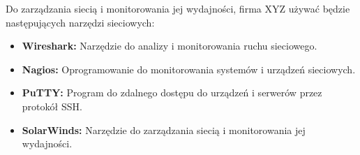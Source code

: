     Do zarządzania siecią i monitorowania jej wydajności, firma XYZ używać będzie następujących narzędzi sieciowych:

    \begin{itemize}
    \item \textbf{Wireshark:} Narzędzie do analizy i monitorowania ruchu sieciowego.
    \item \textbf{Nagios:} Oprogramowanie do monitorowania systemów i urządzeń sieciowych.
    \item \textbf{PuTTY:} Program do zdalnego dostępu do urządzeń i serwerów przez protokół SSH.
    \item \textbf{SolarWinds:} Narzędzie do zarządzania siecią i monitorowania jej wydajności.
    \end{itemize}
